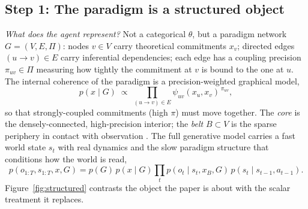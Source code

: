 \subsection{Step 1: The paradigm is a structured object}
\label{ssec:structured}

\noindent\textit{What does the agent represent?} Not a categorical
$\theta$, but a paradigm network $G = (V, E, \Pi)$: nodes $v \in V$
carry theoretical commitments $x_v$; directed edges $(u\!\to\!v) \in E$
carry inferential dependencies; each edge has a coupling precision
$\pi_{uv} \in \Pi$ measuring how tightly the commitment at $v$ is bound
to the one at $u$. The internal coherence of the paradigm is a
precision-weighted graphical model,
\begin{equation}
p(x \mid G) \;\propto\;
\prod_{(u \to v) \in E} \psi_{uv}(x_u, x_v)^{\,\pi_{uv}},
\label{eq:net}
\end{equation}
so that strongly-coupled commitments (high $\pi$) must move together.
The \emph{core} is the densely-connected, high-precision interior; the
\emph{belt} $B \subset V$ is the sparse periphery in contact with
observation \citep{Heijdra1986_6, Ostapiuk2025_11, Wahyudi2026_2}. The
full generative model carries a fast world state $s_t$ with real
dynamics and the slow paradigm structure that conditions how the world
is read,
\begin{equation}
p(o_{1:T}, s_{1:T}, x, G)
= p(G)\,p(x \mid G)\!\prod_t p(o_t \mid s_t, x_B, G)\,
   p(s_t \mid s_{t-1}, a_{t-1}).
\label{eq:gen}
\end{equation}
Figure~\ref{fig:structured} contrasts the object the paper is about
with the scalar treatment it replaces.

